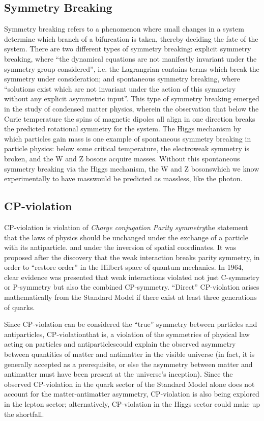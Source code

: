 \subsection{Symmetry Breaking}
Symmetry breaking refers to a phenomenon where small changes in a system determine which branch of a bifurcation is taken, thereby deciding the fate of the system. There are two different types of symmetry breaking: explicit symmetry breaking, where ``the dynamical equations are not manifestly invariant under the symmetry group considered''\cite{Brading:2013:Symmetry}, i.e. the Lagrangrian contains terms which break the symmetry under consideration; and spontaneous symmetry breaking, where “solutions exist which are not invariant under the action of this symmetry without any explicit asymmetric input”. This type of symmetry breaking emerged in the study of condensed matter physics, wherein the observation that below the Curie temperature the spins of magnetic dipoles all align in one direction breaks the predicted rotational symmetry for the system\cite{Brading:2013:Symmetry}. The Higgs mechanism by which particles gain mass is one example of spontaneous symmetry breaking in particle physics: below some critical temperature, the electroweak symmetry is broken, and the W and Z bosons acquire masses. Without this spontaneous symmetry breaking via the Higgs mechanism, the W and Z bosons\textemdash which we know experimentally to have mass\textemdash would be predicted as massless, like the photon.\cite{Fermi:Electroweak}

\subsection{CP-violation}
CP-violation is violation of \emph{Charge conjugation Parity symmetry}\textemdash the statement that the laws of physics should be unchanged under the exchange of a particle with its antiparticle. and under the inversion of spatial coordinates. It was proposed after the discovery that the weak interaction breaks parity symmetry, in order to ``restore order'' in the Hilbert space of quantum mechanics. In 1964, clear evidence was presented that weak interactions violated not just C-symmetry or P-symmetry but also the combined CP-symmetry\cite{CroninFitch:CP}. ``Direct'' CP-violation arises mathematically from the Standard Model if there exist at least three generations of quarks.

Since CP-violation can be considered the ``true'' symmetry between particles and antiparticles, CP-violation\textemdash that is, a violation of the symmetries of physical law acting on particles and antiparticles\textemdash could explain the observed asymmetry between quantities of matter and antimatter in the visible universe (in fact, it is generally accepted as a prerequisite, or else the asymmetry between matter and antimatter must have been present at the universe's inception). Since the observed CP-violation in the quark sector of the Standard Model alone does not account for the matter-antimatter asymmetry, CP-violation is also being explored in the lepton sector; alternatively, CP-violation in the Higgs sector could make up the shortfall\cite{LHC:CP:Higgs}.


